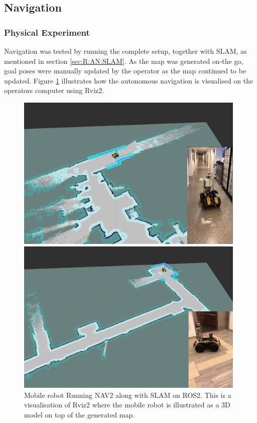 \FloatBarrier
\subsection{Navigation}\label{sec:R:AN:Navigation}
\FloatBarrier
\subsubsection{Physical Experiment}
Navigation was tested by running the complete setup, together with SLAM, as mentioned in section \ref{sec:R:AN:SLAM}. As the map was generated on-the go, goal poses were manually updated by the operator as the map continued to be updated. Figure \ref{fig:R:H:SLAM:figNavUia} illustrates how the autonomous navigation is visualised on the operators computer using Rviz2.

\begin{figure}[htp!]
  \centering
  \begin{minipage}[b]{0.49\textwidth}
        \centering
        \includegraphics[width = 0.98\textwidth]{Figures/figNavUia2.png}
  \end{minipage}
  \hfill
  \begin{minipage}[b]{0.49\textwidth}
    \centering
    \includegraphics[width = 0.98\textwidth]{Figures/figNavUia4.png}
  \end{minipage}
  \caption{Mobile robot Running NAV2 along with SLAM on ROS2. This is a visualisation of Rviz2 where the mobile robot is illustrated as a 3D model on top of the generated map.}
  \label{fig:R:H:SLAM:figNavUia}
\end{figure}

